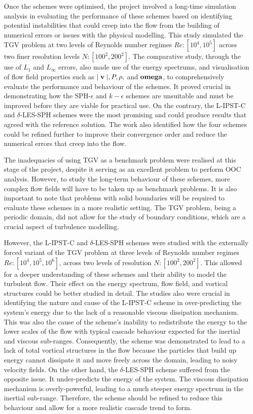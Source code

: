 Once the schemes were optimised, the project involved a long-time simulation analysis in evaluating the performance of these schemes based on identifying potential instabilities that could creep into the flow from the building of numerical errors or issues with the physical modelling. This study simulated the TGV problem at two levels of Reynolds number regimes $Re: [10^4, 10^5]$ across two finer resolution levels $N: [100^2, 200^2]$.
The comparative study, through the use of $L_1$ and $L_{\infty}$ errors, also made use of the energy spectrums, and visualisation of flow field properties such as $\mid \mathbf{v} \mid, P, \rho,$ and  $\mathbf{omega}$, to comprehensively evaluate the performance and behaviour of the schemes.
It proved crucial in demonstrating how the SPH-$\epsilon$ and $k-\epsilon$ schemes are unsuitable and must be improved before they are viable for practical use. 
On the contrary, the L-IPST-C and $\delta$-LES-SPH schemes were the most promising and could produce results that agreed with the reference solution.
The work also identified how the four schemes could be refined further to improve their convergence order and reduce the numerical errors that creep into the flow.

The inadequacies of using TGV as a benchmark problem were realised at this stage of the project, despite it serving as an excellent problem to perform OOC analysis. However,  to study the long-term behaviour of these schemes, more complex flow fields will have to be taken up as benchmark problems. It is also important to note that problems with solid boundaries will be required to evaluate these schemes in a more realistic setting. The TGV problem, being a periodic domain, did not allow for the study of boundary conditions, which are a crucial aspect of turbulence modelling.

However, the L-IPST-C and $\delta$-LES-SPH schemes were studied with the externally forced variant of the TGV problem at three levels of Reynolds number regimes $Re: [10^4, 10^5, 10^6]$, across two levels of resolution $N: [100^2, 200^2]$.
This allowed for a deeper understanding of these schemes and their ability to model the turbulent flow. Their effect on the energy spectrum, flow field, and vortical structures could be better studied in detail.
The studies also were crucial in identifying the nature and cause of the L-IPST-C scheme in over-predicting the system's energy due to the lack of a reasonable viscous dissipation mechanism. This was also the cause of the scheme's inability to redistribute the energy to the lower scales of the flow with typical cascade behaviour expected for the inertial and viscous sub-ranges. Consequently, the scheme was demonstrated to lead to a lack of total vortical structures in the flow because the particles that build up energy cannot dissipate it and move freely across the domain, leading to noisy velocity fields.
On the other hand, the $\delta$-LES-SPH scheme suffered from the opposite issue. It under-predicts the energy of the system. The viscous dissipation mechanism is overly-powerful, leading to a much steeper energy spectrum in the inertial sub-range. Therefore, the scheme should be refined to reduce this behaviour and allow for a more realistic cascade trend to form.

